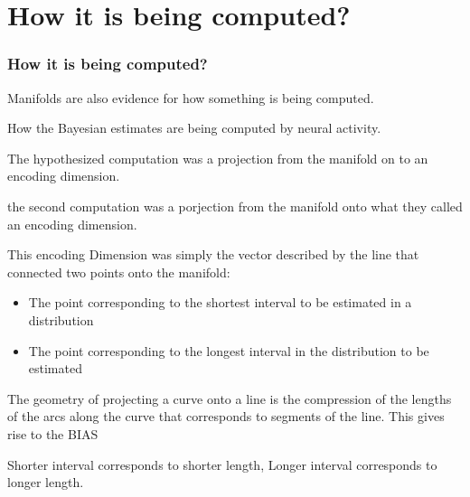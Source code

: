 \documentclass{beamer}
\begin{document}
\section{How it is being computed?}
\begin{frame}
\frametitle{\textbf{How it is being computed?} }
Manifolds are also evidence for how something is being computed.

How the Bayesian estimates are being computed by neural activity.

The hypothesized computation was a projection from the manifold on to an encoding dimension.


the second computation was a porjection from the manifold onto what they called an encoding dimension.

This encoding Dimension was simply the vector described by the line that connected two points onto the manifold:

\begin{itemize}
    \item The point corresponding to the shortest interval to be estimated in a distribution
    \item The point corresponding to the longest interval in the distribution to be estimated
\end{itemize}

The geometry of projecting a curve onto a line is the compression of the lengths of the arcs along the curve that corresponds to segments of the line. This gives rise to the BIAS

Shorter interval corresponds to shorter length, Longer interval corresponds to longer length.


\end{frame}

\end{document}
